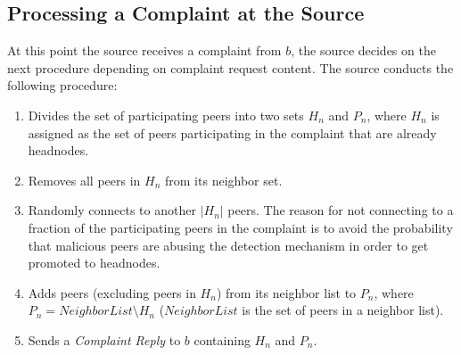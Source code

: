 \subsection{Processing a Complaint at the Source}
\label{complaint_source}

At this point the source receives a complaint from $b$, the source decides on the next procedure depending on complaint request content.
The source conducts the following procedure:
\begin{enumerate}
 \item Divides the set of participating peers into two sets $H_n$ and $P_n$, where $H_n$ is assigned as the set of peers participating in the complaint that are already headnodes. 
 \item Removes all peers in $H_n$ from its neighbor set.
 \item Randomly connects to another $|H_n|$ peers. 
 The reason for not connecting to a fraction of the participating peers in the complaint is to avoid the probability that malicious peers are abusing the detection mechanism in order to get promoted to headnodes.
 \item Adds peers (excluding peers in $H_n$) from its neighbor list to $P_n$, where $P_n = NeighborList\setminus H_n$ ($NeighborList$ is the set of peers in a neighbor list). 
 \item Sends a \textit{Complaint Reply} to $b$ containing $H_n$ and $P_n$.
\end{enumerate}



